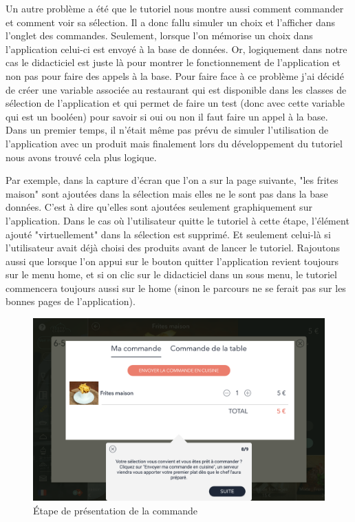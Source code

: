 Un autre problème a été que le tutoriel nous montre aussi comment commander et comment voir sa sélection. Il a donc fallu simuler un choix et l'afficher dans l'onglet des commandes. Seulement, lorsque l'on mémorise un choix dans l'application celui-ci est envoyé à la base de données. Or, logiquement dans notre cas le didacticiel est juste là pour montrer le fonctionnement de l'application et non pas pour faire des appels à la base. Pour faire face à ce problème j'ai décidé de créer une variable associée au restaurant qui est disponible dans les classes de sélection de l'application et qui permet de faire un test (donc avec cette variable qui est un booléen) pour savoir si oui ou non il faut faire un appel à la base. Dans un premier temps, il n'était même pas prévu de simuler l'utilisation de l'application avec un produit mais finalement lors du développement du tutoriel nous avons trouvé cela plus logique. 

Par exemple, dans la capture d'écran que l'on a sur la page suivante, "les frites maison" sont ajoutées dans la sélection mais elles ne le sont pas dans la base données. C'est à dire qu'elles sont ajoutées seulement graphiquement sur l'application. Dans le cas où l'utilisateur quitte le tutoriel à cette étape, l'élément ajouté "virtuellement" dans la sélection est supprimé. Et seulement celui-là si l'utilisateur avait déjà choisi des produits avant de lancer le tutoriel. Rajoutons aussi que lorsque l'on appui sur le bouton quitter l'application revient toujours sur le menu home, et si on clic sur le didacticiel dans un sous menu, le tutoriel commencera toujours aussi sur le home (sinon le parcours ne se ferait pas sur les bonnes pages de l'application).

\clearpage

\begin{figure}[!htb]
  \centering
  \includegraphics[width=115mm,scale=0.5]{images/tutoriel_screen3.png}
  \caption{Étape de présentation de la commande}
  \label{fig:boat1}
\end{figure}

